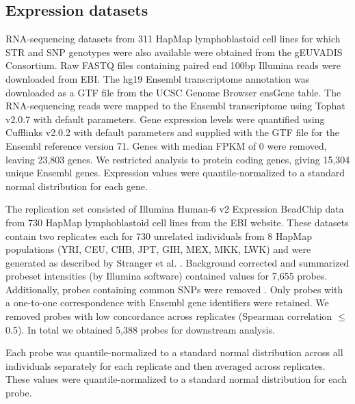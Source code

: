 \subsection{Expression datasets}
RNA-sequencing datasets from 311 HapMap lymphoblastoid cell lines for which STR and SNP genotypes were also available were obtained from the gEUVADIS Consortium. Raw FASTQ files containing paired end 100bp Illumina reads were downloaded from EBI. The hg19 Ensembl transcriptome annotation was downloaded as a GTF file from the UCSC Genome Browser \cite{KentSugnetFureyEtAl2002,KarolchikBarberCasperEtAl2014} ensGene table. The RNA-sequencing reads were mapped to the Ensembl transcriptome using Tophat v2.0.7 \cite{TrapnellPachterSalzberg2009} with default parameters. Gene expression levels were quantified using Cufflinks v2.0.2 \cite{TrapnellRobertsGoffEtAl2012} with default parameters and supplied with the GTF file for the Ensembl reference version 71. Genes with median FPKM of 0 were removed, leaving 23,803 genes. We restricted analysis to protein coding genes, giving 15,304 unique Ensembl genes. Expression values were quantile-normalized to a standard normal distribution for each gene.

The replication set consisted of Illumina Human-6 v2 Expression BeadChip data from 730 HapMap lymphoblastoid cell lines from the EBI website. These datasets contain two replicates each for 730 unrelated individuals from 8 HapMap populations (YRI, CEU, CHB, JPT, GIH, MEX, MKK, LWK) and were generated as described by Stranger et al. \cite{StrangerNicaForrestEtAl2007}. Background corrected and summarized probeset intensities (by Illumina software) contained values for 7,655 probes. Additionally, probes containing common SNPs were removed \cite{Barbosa-MoraisDunningSamarajiwaEtAl2010}. Only probes with a one-to-one correspondence with Ensembl gene identifiers were retained. We removed probes with low concordance across replicates (Spearman correlation $\leq$ 0.5). In total we obtained 5,388 probes for downstream analysis.

Each probe was quantile-normalized to a standard normal distribution across all individuals separately for each replicate and then averaged across replicates. These values were quantile-normalized to a standard normal distribution for each probe.

